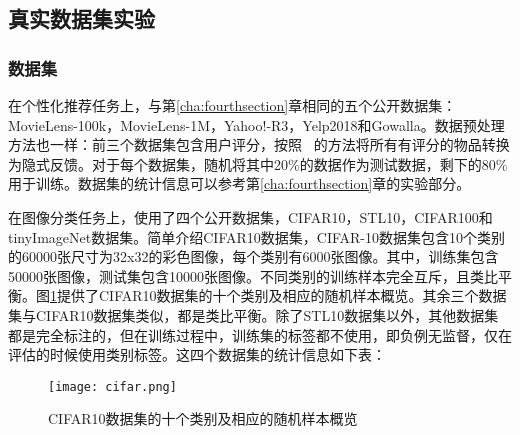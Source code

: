 \subsection{真实数据集实验}
\subsubsection{数据集}
在个性化推荐任务上，与第\ref{cha:fourthsection}章相同的五个公开数据集：MovieLens-100k，MovieLens-1M，Yahoo!-R3，Yelp2018和Gowalla。数据预处理方法也一样：前三个数据集包含用户评分，按照~\cite{Steffen:2009:UAI,Zhang:2013:SIGIR,Steffen:2014:WSDM} 的方法将所有有评分的物品转换为隐式反馈。对于每个数据集，随机将其中20\%的数据作为测试数据，剩下的80\%用于训练。数据集的统计信息可以参考第\ref{cha:fourthsection}章的实验部分。

在图像分类任务上，使用了四个公开数据集，CIFAR10，STL10，CIFAR100和tinyImageNet数据集。简单介绍CIFAR10数据集，CIFAR-10数据集包含10个类别的60000张尺寸为32x32的彩色图像，每个类别有6000张图像。其中，训练集包含50000张图像，测试集包含10000张图像。不同类别的训练样本完全互斥，且类比平衡。图\ref{Fig:cifar}提供了CIFAR10数据集的十个类别及相应的随机样本概览。其余三个数据集与CIFAR10数据集类似，都是类比平衡。除了STL10数据集以外，其他数据集都是完全标注的，但在训练过程中，训练集的标签都不使用，即负例无监督，仅在评估的时候使用类别标签。这四个数据集的统计信息如下表：
\begin{figure}[h!]
	\centering
	\texttt{[image: cifar.png]}
	\caption{CIFAR10数据集的十个类别及相应的随机样本概览}
	\label{Fig:cifar}
\end{figure}
\begin{table*}[h!]
	\centering
	\small
	\caption{图像分类任务数据集统计信息}\label{5Table:Dataset}
\end{table*}

